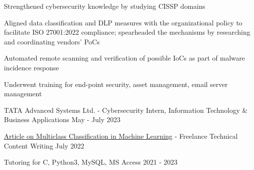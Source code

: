 
\begin{cventries}

  \cventry
    {
     \begin{cvitems} %
        \item{Strengthened cybersecurity knowledge by studying CISSP domains}
        \item{Aligned data classification and DLP measures with the organizational policy to facilitate ISO 27001:2022 compliance; spearheaded the mechanisms by researching and coordinating vendors' PoCs}
        \item{Automated remote scanning and verification of possible IoCs as part of malware incidence response}
         \item{Underwent training for end-point security, asset management, email server management}
      \end{cvitems}
    } %
    {TATA Advanced Systems Ltd. - Cybersecurity Intern, Information Technology \& Business Applications} %
    {May - July 2023} %
    {} %
    {}

 \vspace{-4.0mm} 


  \cventry
    {} %
    {\href{https://copyassignment.com/multiclass-classification-in-machine-learning/}{Article on Multiclass Classification in Machine Learning} - Freelance Technical Content Writing} %
    {July 2022} %
    {} %
    { 
    }

 \vspace{-8.5mm} 
 
  \cventry
{} %
{Tutoring for C, Python3, MySQL, MS Access} %
{2021 - 2023} %
{} %
{ 
}


 
 \vspace{-6.5mm} 

\end{cventries}
